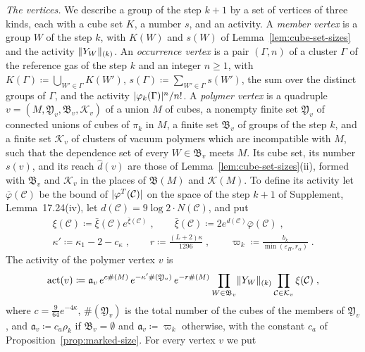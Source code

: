 \documentclass[11pt]{preprint}
\DeclarePairedDelimiter{\abs}{\lvert}{\rvert}
\DeclarePairedDelimiter{\norm}{\lVert}{\rVert}
\numberwithin{equation}{section}
\theoremstyle{definition}
\theoremstyle{remark}
\theoremstyle{plain}
\begin{document}
\emph{The vertices.} We describe a group of the step $k + 1$ by a set of vertices of three kinds, each with a cube set $K$, a number $s$, and an activity. A \emph{member vertex} is a group $W$ of the step $k$, with $K(W)$ and $s(W)$ of Lemma~\ref{lem:cube-set-sizes} and the activity $\norm{Y_W}_{(k)}$. An \emph{occurrence vertex} is a pair $(\Gamma, n)$ of a cluster $\Gamma$ of the reference gas of the step $k$ and an integer $n \geq 1$, with $K(\Gamma) \coloneqq \bigcup_{W' \in \Gamma}K(W')$, $s(\Gamma) \coloneqq \sum_{W' \in \Gamma}s(W')$, the sum over the distinct groups of $\Gamma$, and the activity $\abs{\varphi_k(\Gamma)}^n/n!$. A \emph{polymer vertex} is a quadruple $v = (M, \mathfrak Y_v, \mathfrak B_v, \mathcal K_v)$ of a union $M$ of cubes, a nonempty finite set $\mathfrak Y_v$ of connected unions of cubes of $\pi_k$ in $M$, a finite set $\mathfrak B_v$ of groups of the step $k$, and a finite set $\mathcal K_v$ of clusters of vacuum polymers which are incompatible with $M$, such that the dependence set of every $W \in \mathfrak B_v$ meets $M$. Its cube set, its number $s(v)$, and its reach $\hat d(v)$ are those of Lemma~\ref{lem:cube-set-sizes}(ii), formed with $\mathfrak B_v$ and $\mathcal K_v$ in the places of $\mathfrak B(M)$ and $\mathcal K(M)$. To define its activity let $\bar\varphi(\mathcal C)$ be the bound of $\abs{\varphi^T(\mathcal C)}$ on the space of the step $k + 1$ of Supplement, Lemma~17.24(iv), let $d(\mathcal C) = 9\log 2 \cdot N(\mathcal C)$, and put
\begin{equation}\label{eq:vertex-constants}
\begin{gathered}
    \xi(\mathcal C) \coloneqq \bar\xi(\mathcal C)e^{\bar\xi(\mathcal C)}\;,
    \qquad
    \bar\xi(\mathcal C) \coloneqq 2e^{d(\mathcal C)}\bar\varphi(\mathcal C)\;,\\
    \kappa' \coloneqq \kappa_1 - 2 - c_\kappa\;,
    \qquad
    r \coloneqq \frac{(L + 2)\kappa}{1296}\;,
    \qquad
    \varpi_k \coloneqq \frac{b_k}{\min(\varepsilon_H, r_\alpha)}\;.
\end{gathered}
\end{equation}
The activity of the polymer vertex $v$ is
\begin{equation}\label{eq:polymer-activity}
    \operatorname{act}(v) \coloneqq \mathfrak a_v\,e^{c\#(M)}\,e^{-\kappa'\#(\mathfrak Y_v)}\,e^{-r\#(M)}\prod_{W \in \mathfrak B_v}\norm{Y_W}_{(k)}\prod_{\mathcal C \in \mathcal K_v}\xi(\mathcal C)\;,
\end{equation}
where $c = \frac{9}{64}e^{-4\kappa}$, $\#(\mathfrak Y_v)$ is the total number of the cubes of the members of $\mathfrak Y_v$, and $\mathfrak a_v \coloneqq c_a\rho_k$ if $\mathfrak B_v = \emptyset$ and $\mathfrak a_v \coloneqq \varpi_k$ otherwise, with the constant $c_a$ of Proposition~\ref{prop:marked-size}. For every vertex $v$ we put
\end{document}
